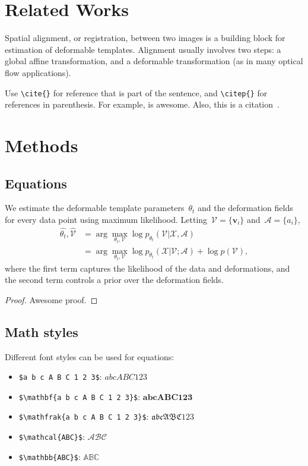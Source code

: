 \documentclass[twoside,11pt]{article}
\begin{document}
\section{Related Works}
	Spatial alignment, or registration, between two images is a building block for estimation of deformable templates. Alignment usually involves two steps: a global affine transformation, and a deformable transformation (as in many optical flow applications).

	Use \verb|\cite{}| for reference that is part of the sentence, and \verb|\citep{}| for references in parenthesis. For example, \cite{viola1997alignment} is awesome. Also, this is a citation~\citep{viola1997alignment}.



\section{Methods}
	\subsection{Equations}
		We estimate the deformable template parameters~$\theta_t$ and the deformation fields for every data point using maximum likelihood. Letting~$\mathcal{V} = \{\boldsymbol{v}_i\}$ and~$\mathcal{A} = \{a_i\}$,
		\begin{align}
			\hat{\theta_t}, \hat{\mathcal{V}} &= \arg \max_{\theta_t, \mathcal{V}} \log p_{\theta_t}(\mathcal{V} | \mathcal{X},  \mathcal{A}) \nonumber \\
			&= \arg \max_{\theta_t, \mathcal{V}} \log p_{\theta_t}(\mathcal{X} | \mathcal{V}; \mathcal{A}) + \log p(\mathcal{V}),
			\label{eq:logpost}
		\end{align}
		where the first term captures the likelihood of the data and deformations, and the second term controls a prior over the deformation fields.

		\begin{proof}
			Awesome proof.
		\end{proof}

	\subsection{Math styles}
		Different font styles can be used for equations:
		\begin{itemize}
			\item \verb|$a b c A B C 1 2 3$|: $ a b c A B C 1 2 3 $
			\item \verb|$\mathbf{a b c A B C 1 2 3}$|: $ \mathbf{a b c A B C 1 2 3} $
			\item \verb|$\mathfrak{a b c A B C 1 2 3}$|: $ \mathfrak{a b c A B C 1 2 3} $
			\item \verb|$\mathcal{ABC}$|: $ \mathcal{ABC} $
			\item \verb|$\mathbb{ABC}$|: $ \mathbb{ABC} $
		\end{itemize}
\end{document}
